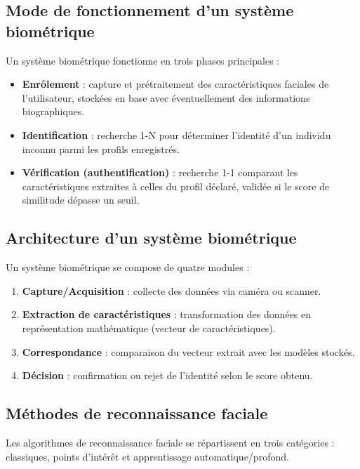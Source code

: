 \documentclass[12pt]{article}
\begin{document}
\begin{center}
\subsection{Mode de fonctionnement d'un système biométrique}
Un système biométrique fonctionne en trois phases principales :
\begin{itemize}[leftmargin=*, label=\textbullet]
    \item \textbf{Enrôlement} : capture et prétraitement des caractéristiques faciales de l'utilisateur, stockées en base avec éventuellement des informations biographiques.
    \item \textbf{Identification} : recherche 1-N pour déterminer l'identité d'un individu inconnu parmi les profils enregistrés.
    \item \textbf{Vérification (authentification)} : recherche 1-1 comparant les caractéristiques extraites à celles du profil déclaré, validée si le score de similitude dépasse un seuil.
\end{itemize}

\subsection*{Architecture d'un système biométrique}
Un système biométrique se compose de quatre modules :
\begin{enumerate}[leftmargin=*, label=\arabic*.]
    \item \textbf{Capture/Acquisition} : collecte des données via caméra ou scanner.
    \item \textbf{Extraction de caractéristiques} : transformation des données en représentation mathématique (vecteur de caractéristiques).
    \item \textbf{Correspondance} : comparaison du vecteur extrait avec les modèles stockés.
    \item \textbf{Décision} : confirmation ou rejet de l'identité selon le score obtenu.
\end{enumerate}

\subsection{Méthodes de reconnaissance faciale}
Les algorithmes de reconnaissance faciale se répartissent en trois catégories : classiques, points d'intérêt et apprentissage automatique/profond.


\end{center}
\end{document}
